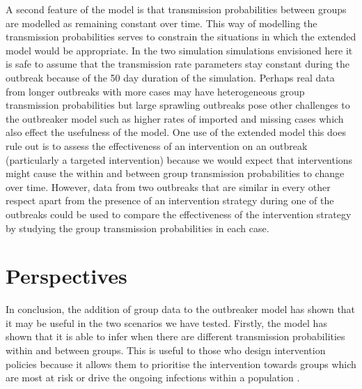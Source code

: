 \documentclass[11pt,a4paper]{report}
\begin{document}
A second feature of the model is that transmission probabilities between groups are modelled as remaining constant over time. This way of modelling the transmission probabilities serves to constrain the situations in which the extended model would be appropriate. In the two simulation simulations envisioned here it is safe to assume that the transmission rate parameters stay constant during the outbreak because of the 50 day duration of the simulation. Perhaps real data from longer outbreaks with more cases may have heterogeneous group transmission probabilities but large sprawling outbreaks pose other challenges to the outbreaker model such as higher rates of imported and missing cases which also effect the usefulness of the model. One use of the extended model this does rule out is to assess the effectiveness of an intervention on an outbreak (particularly a targeted intervention) because we would expect that interventions might cause the within and between group transmission probabilities to change over time. However, data from two outbreaks that are similar in every other respect apart from the presence of an intervention strategy during one of the outbreaks could be used to compare the effectiveness of the intervention strategy by studying the group transmission probabilities in each case.


\section{Perspectives}
In conclusion, the addition of group data to the outbreaker model has shown that it may be useful in the two scenarios we have tested. Firstly, the model has shown that it is able to infer when there are different transmission probabilities within and between groups. This is useful to those who design intervention policies because it allows them to prioritise the intervention towards groups which are most at risk or drive the ongoing infections within a population \citep{Wallinga10,Dushoff07}.




\end{document}
